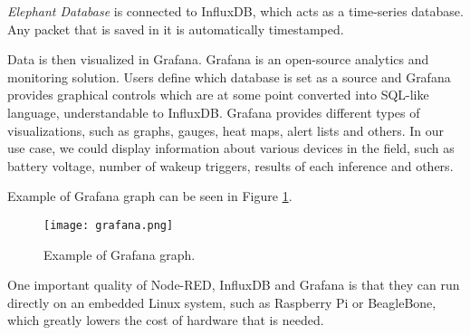 \textit{Elephant Database} is connected to InfluxDB, which acts as a time-series database.
Any packet that is saved in it is automatically timestamped.

Data is then visualized in Grafana. 
Grafana is an open-source analytics and monitoring solution.
Users define which database is set as a source and Grafana provides graphical controls which are at some point converted into SQL-like language, understandable to InfluxDB.
Grafana provides different types of visualizations, such as graphs, gauges, heat maps, alert lists and others.
In our use case, we could display information about various devices in the field, such as battery voltage, number of wakeup triggers, results of each inference and others.

Example of Grafana graph can be seen in Figure \ref{grafana}.
\clearpage
\begin{figure}[ht]
    \centering
    \texttt{[image: grafana.png]} 
    \caption{ Example of Grafana graph.}
    \label{grafana}
\end{figure}

One important quality of Node-RED, InfluxDB and Grafana is that they can run directly on an embedded Linux system, such as Raspberry Pi or BeagleBone, which greatly lowers the cost of hardware that is needed.
